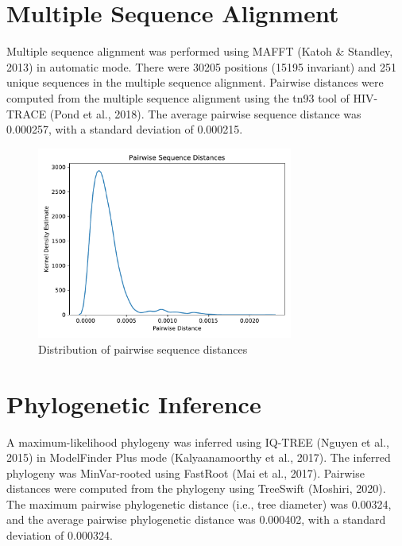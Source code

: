 \documentclass{article}
\begin{document}
\section{Multiple Sequence Alignment}
Multiple sequence alignment was performed using MAFFT (Katoh \& Standley, 2013) in automatic mode.
There were 30205 positions (15195 invariant) and 251 unique sequences in the multiple sequence alignment.
Pairwise distances were computed from the multiple sequence alignment using the tn93 tool of HIV-TRACE (Pond et al., 2018).
The average pairwise sequence distance was 0.000257,
with a standard deviation of 0.000215.


\begin{figure}[h]
\centering
\includegraphics[width=0.75\textwidth,keepaspectratio]{./figs/pairwise_distances_sequences.pdf}
\caption{Distribution of pairwise sequence distances}
\end{figure}

\section{Phylogenetic Inference}
A maximum-likelihood phylogeny was inferred using IQ-TREE (Nguyen et al., 2015) in ModelFinder Plus mode (Kalyaanamoorthy et al., 2017).
The inferred phylogeny was MinVar-rooted using FastRoot (Mai et al., 2017).
Pairwise distances were computed from the phylogeny using TreeSwift (Moshiri, 2020).
The maximum pairwise phylogenetic distance (i.e., tree diameter) was 0.00324,
and the average pairwise phylogenetic distance was 0.000402,
with a standard deviation of 0.000324.
\end{document}
